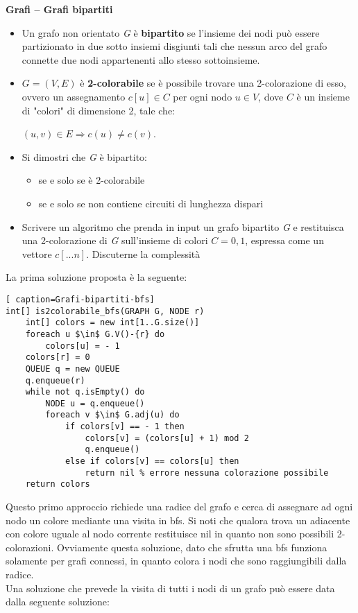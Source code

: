 \documentclass[../cheatSheetAlgoritmi.tex]{subfiles}
\begin{document}
\textbf{Grafi – Grafi bipartiti}

\begin{itemize}
	\item Un grafo non orientato \textit{G} è \textbf{bipartito} se l’insieme dei nodi può essere partizionato in due sotto insiemi disgiunti tali che nessun arco del grafo connette due nodi appartenenti allo stesso sottoinsieme.
	\item $G = (V, E)$ è \textbf{2-colorabile} se è possibile trovare una 2-colorazione di esso, ovvero un assegnamento $c[u] \in C$ per ogni nodo $u \in V$, dove $C$ è un insieme di "colori" di dimensione 2, tale che: 

	\begin{center}
		$(u, v) \in E \Rightarrow c(u) \neq c(v)$.
	\end{center}

	\item Si dimostri che \textit{G} è bipartito:
	
	\begin{itemize}
		\item se e solo se è 2-colorabile
		\item se e solo se non contiene circuiti di lunghezza dispari
	\end{itemize}
	\item Scrivere un algoritmo che prenda in input un grafo bipartito \textit{G} e restituisca una 2-colorazione di \textit{G} sull’insieme di colori $C = {0,1}$, espressa come un vettore $c[...n]$. Discuterne la complessità
\end{itemize}

La prima soluzione proposta è la seguente:
\begin{lstlisting}[ caption=Grafi-bipartiti-bfs]
int[] is2colorabile_bfs(GRAPH G, NODE r)
	int[] colors = new int[1..G.size()]
  	foreach u $\in$ G.V()-{r} do
    	colors[u] = - 1
  	colors[r] = 0
  	QUEUE q = new QUEUE
  	q.enqueue(r)
  	while not q.isEmpty() do
    	NODE u = q.enqueue()
    	foreach v $\in$ G.adj(u) do
      		if colors[v] == - 1 then
        		colors[v] = (colors[u] + 1) mod 2
        		q.enqueue()
      		else if colors[v] == colors[u] then
        		return nil % errore nessuna colorazione possibile
  	return colors
\end{lstlisting}
Questo primo approccio richiede una radice del grafo e cerca di assegnare ad ogni nodo un colore mediante una visita in bfs. Si noti che qualora trova un adiacente con colore uguale al nodo corrente restituisce nil in quanto non sono possibili 2-colorazioni. Ovviamente questa soluzione, dato che sfrutta una bfs funziona solamente per grafi connessi, in quanto colora i nodi che sono raggiungibili dalla radice.\\
Una soluzione che prevede la visita di tutti i nodi di un grafo può essere data dalla seguente soluzione:
 
\end{document}
